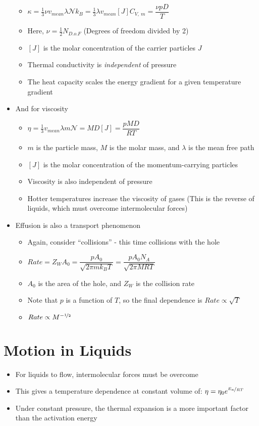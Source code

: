 \documentclass[12pt, openany, letterpaper]{memoir}
\begin{document}
\begin{itemize}
	      \begin{itemize}
		      \item $\kappa = \frac{1}{3}\nu v_{mean}\lambda\mathcal{N}k_B = \frac{1}{3}\lambda v_{mean}[J]C_{V,~m} = \dfrac{\nu pD}{T}$
		      \item Here, $\nu = \frac{1}{2}N_{D.o.F}$ (Degrees of freedom divided by 2)
		      \item $[J]$ is the molar concentration of the carrier particles $J$
		      \item Thermal conductivity is \emph{independent} of pressure
		      \item The heat capacity scales the energy gradient for a given temperature gradient
	      \end{itemize}
	\item And for viscosity
	      \begin{itemize}
		      \item $\eta = \frac{1}{3}v_{mean}\lambda m\mathcal{N} = MD[J] = \dfrac{pMD}{RT}$
		      \item $m$ is the particle mass, $M$ is the molar mass, and $\lambda$ is the mean free path
		      \item $[J]$ is the molar concentration of the momentum-carrying particles
		      \item Viscosity is also independent of pressure
		      \item Hotter temperatures increase the viscosity of gases (This is the reverse of liquids, which must overcome intermolecular forces)
	      \end{itemize}
	\item Effusion is also a transport phenomenon
	      \begin{itemize}
		      \item Again, consider “collisions” - this time collisions with the hole
		      \item $Rate = Z_WA_0=\dfrac{pA_0}{\sqrt{2\pi m k_BT}}=\dfrac{pA_0N_A}{\sqrt{2\pi MRT}}$
		      \item $A_0$ is the area of the hole, and $Z_W$ is the collision rate
		      \item Note that $p$ is a function of $T$, so the final dependence is $Rate\propto\sqrt{T}$
		      \item $Rate\propto M^{-\nicefrac{1}{2}}$
	      \end{itemize}
\end{itemize}

\section{Motion in Liquids}
\begin{itemize}
	\item For liquids to flow, intermolecular forces must be overcome
	\item This gives a temperature dependence at constant volume of: $\eta=\eta_0e^{\nicefrac{E_a}{RT}}$
	\item Under constant pressure, the thermal expansion is a more important factor than the activation energy
\end{itemize}
\end{document}
